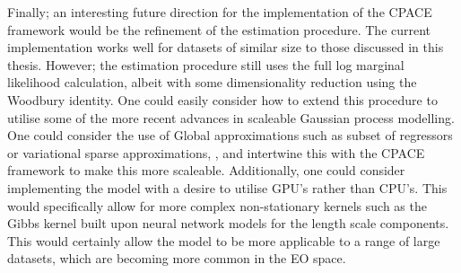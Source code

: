Finally; an interesting future direction for the implementation of the CPACE framework would be the refinement of the estimation procedure.
The current implementation works well for datasets of similar size to those discussed in this thesis.
However; the estimation procedure still uses the full log marginal likelihood calculation, albeit with some dimensionality reduction using the Woodbury identity.
One could easily consider how to extend this procedure to utilise some of the more recent advances in scaleable Gaussian process modelling.
One could consider the use of Global approximations such as subset of regressors or variational sparse approximations, \citep{liu_when_2020}, and intertwine this with the CPACE framework to make this more scaleable.
Additionally, one could consider implementing the model with a desire to utilise GPU's rather than CPU's.
This would specifically allow for more complex non-stationary kernels such as the Gibbs kernel built upon neural network models for the length scale components.
This would certainly allow the model to be more applicable to a range of large datasets, which are becoming more common in the EO space.
